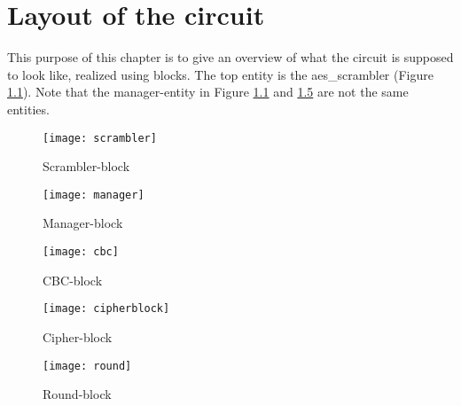\chapter{Layout of the circuit} \label{app:blocks}
This purpose of this chapter is to give an overview of what the circuit is 
supposed to look like, realized using blocks. The top entity is the 
aes\_scrambler (Figure \ref{block:scrambler}). Note that the manager-entity in Figure \ref{block:scrambler} and 
\ref{block:round} are not the same entities.

\begin{figure}
  \texttt{[image: scrambler]}
  \caption{Scrambler-block}
  \label{block:scrambler}
\end{figure}

\begin{figure}
  \texttt{[image: manager]}
  \caption{Manager-block}
  \label{block:manager}
\end{figure}

\begin{figure}
  \texttt{[image: cbc]}
  \caption{CBC-block}
  \label{block:cbc}
\end{figure}

\begin{figure}
  \texttt{[image: cipherblock]}
  \caption{Cipher-block}
  \label{block:cipher}
\end{figure}

\begin{figure}
  \texttt{[image: round]}
  \caption{Round-block}
  \label{block:round}
\end{figure}
